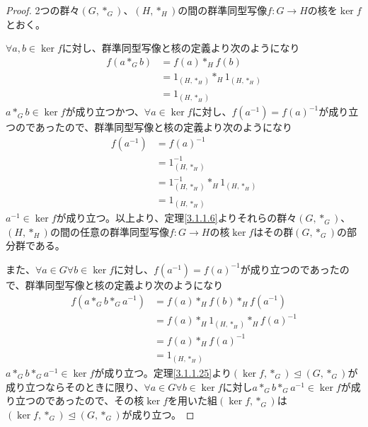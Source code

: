 \documentclass[dvipdfmx]{jsarticle}
\begin{document}
\begin{proof}
2つの群々$\left( G,*_{G} \right)$、$\left( H,*_{H} \right)$の間の群準同型写像$f:G \rightarrow H$の核を$\ker f$とおく。\par
$\forall a,b \in \ker f$に対し、群準同型写像と核の定義より次のようになり
\begin{align*}
f\left( a*_{G}b \right) &= f(a)*_{H}f(b)\\
&= 1_{\left( H,*_{H} \right)}*_{H}1_{\left( H,*_{H} \right)}\\
&= 1_{\left( H,*_{H} \right)}
\end{align*}
$a*_{G}b \in \ker f$が成り立つかつ、$\forall a \in \ker f$に対し、$f\left( a^{- 1} \right) = {f(a)}^{- 1}$が成り立つのであったので、群準同型写像と核の定義より次のようになり
\begin{align*}
f\left( a^{- 1} \right) &= {f(a)}^{- 1}\\
&= 1_{\left( H,*_{H} \right)}^{- 1}\\
&= 1_{\left( H,*_{H} \right)}^{- 1}*_{H}1_{\left( H,*_{H} \right)}\\
&= 1_{\left( H,*_{H} \right)}
\end{align*}
$a^{- 1} \in \ker f$が成り立つ。以上より、定理\ref{3.1.1.6}よりそれらの群々$\left( G,*_{G} \right)$、$\left( H,*_{H} \right)$の間の任意の群準同型写像$f:G \rightarrow H$の核$\ker f$はその群$\left( G,*_{G} \right)$の部分群である。\par
また、$\forall a \in G\forall b \in \ker f$に対し、$f\left( a^{- 1} \right) = {f(a)}^{- 1}$が成り立つのであったので、群準同型写像と核の定義より次のようになり
\begin{align*}
f\left( a*_{G}b*_{G}a^{- 1} \right) &= f(a)*_{H}f(b)*_{H}f\left( a^{- 1} \right)\\
&= f(a)*_{H}1_{\left( H,*_{H} \right)}*_{H}{f(a)}^{- 1}\\
&= f(a)*_{H}{f(a)}^{- 1}\\
&= 1_{\left( H,*_{H} \right)}
\end{align*}
$a*_{G}b*_{G}a^{- 1} \in \ker f$が成り立つ。定理\ref{3.1.1.25}より$\left( \ker f,*_{G} \right) \trianglelefteq \left( G,*_{G} \right)$が成り立つならそのときに限り、$\forall a \in G\forall b \in \ker f$に対し$a*_{G}b*_{G}a^{- 1} \in \ker f$が成り立つのであったので、その核$\ker f$を用いた組$\left( \ker f,*_{G} \right)$は$\left( \ker f,*_{G} \right) \trianglelefteq \left( G,*_{G} \right)$が成り立つ。
\end{proof}
\end{document}
